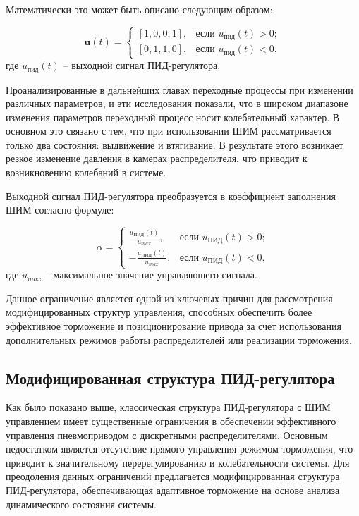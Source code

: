 Математически это может быть описано следующим образом:

\begin{equation}
	\mathbf{u}(t) = \begin{cases}
		[1,0,0,1], & \text{если } u_\text{пид}(t) > 0; \\
		[0,1,1,0], & \text{если } u_\text{пид}(t) < 0,
	\end{cases}
\end{equation}
где $u_\text{пид}(t)$ -- выходной сигнал ПИД-регулятора.

Проанализированные в дальнейших главах переходные процессы при изменении различных
параметров, и эти исследования показали, что в широком диапазоне
изменения параметров переходный процесс носит колебательный характер. В основном это связано с
тем, что при использовании ШИМ рассматривается только два состояния: выдвижение и втягивание.
В результате этого возникает резкое изменение давления в камерах распределителя, что приводит к возникновению
колебаний в системе.

Выходной сигнал ПИД-регулятора
преобразуется в коэффициент заполнения ШИМ согласно формуле:

\begin{equation}
	\alpha = \begin{cases}
		\frac{u_\text{ПИД}(t)}{u_{max}},  & \text{если } u_\text{ПИД}(t) > 0; \\
		-\frac{u_\text{ПИД}(t)}{u_{max}}, & \text{если } u_\text{ПИД}(t) < 0,
	\end{cases}
\end{equation}
где $u_{max}$ -- максимальное значение управляющего сигнала.

Данное ограничение является одной из ключевых причин для рассмотрения модифицированных
структур управления, способных обеспечить более эффективное торможение и позиционирование
привода за счет использования дополнительных режимов работы распределителей или реализации
торможения.

\subsection*{Модифицированная структура ПИД-регулятора}\label{subsec:ch3/sec2/sub3}

Как было показано выше, классическая структура ПИД-регулятора с ШИМ управлением имеет
существенные ограничения в обеспечении эффективного управления пневмоприводом с
дискретными распределителями. Основным недостатком является отсутствие прямого управления режимом торможения,
что приводит к значительному перерегулированию и колебательности системы. Для преодоления данных ограничений
предлагается модифицированная структура ПИД-регулятора, обеспечивающая адаптивное торможение на основе анализа динамического состояния системы.

